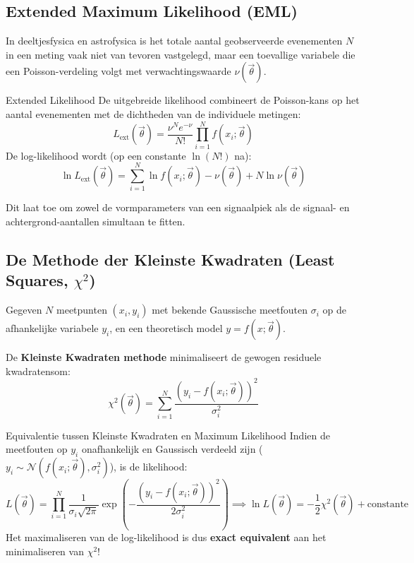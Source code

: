 \documentclass[11pt,a4paper]{article}
\newcommand{\normdist}{\mathcal{N}}
\begin{document}
\subsection{Extended Maximum Likelihood (EML)}
In deeltjesfysica en astrofysica is het totale aantal geobserveerde evenementen $N$ in een meting vaak niet van tevoren vastgelegd, maar een toevallige variabele die een Poisson-verdeling volgt met verwachtingswaarde $\nu(\vec{\theta})$.

\begin{defbox}{Extended Likelihood}
De uitgebreide likelihood combineert de Poisson-kans op het aantal evenementen met de dichtheden van de individuele metingen:
\begin{equation}
    L_{\text{ext}}(\vec{\theta}) = \frac{\nu^N e^{-\nu}}{N!} \prod_{i=1}^N f(x_i; \vec{\theta})
\end{equation}
De log-likelihood wordt (op een constante $\ln(N!)$ na):
\begin{equation}
    \ln L_{\text{ext}}(\vec{\theta}) = \sum_{i=1}^N \ln f(x_i; \vec{\theta}) - \nu(\vec{\theta}) + N \ln \nu(\vec{\theta})
\end{equation}
\end{defbox}
Dit laat toe om zowel de vormparameters van een signaalpiek als de signaal- en achtergrond-aantallen simultaan te fitten.

\subsection{De Methode der Kleinste Kwadraten (Least Squares, \texorpdfstring{$\chi^2$}{Chi-kwadraat})}
Gegeven $N$ meetpunten $(x_i, y_i)$ met bekende Gaussische meetfouten $\sigma_i$ op de afhankelijke variabele $y_i$, en een theoretisch model $y = f(x; \vec{\theta})$.

\begin{formulabox}
De \textbf{Kleinste Kwadraten methode} minimaliseert de gewogen residuele kwadratensom:
\begin{equation}
    \chi^2(\vec{\theta}) = \sum_{i=1}^N \frac{(y_i - f(x_i; \vec{\theta}))^2}{\sigma_i^2}
\end{equation}
\end{formulabox}

\begin{theobox}{Equivalentie tussen Kleinste Kwadraten en Maximum Likelihood}
Indien de meetfouten op $y_i$ onafhankelijk en Gaussisch verdeeld zijn ($y_i \sim \normdist(f(x_i; \vec{\theta}), \sigma_i^2)$), is de likelihood:
\begin{equation}
    L(\vec{\theta}) = \prod_{i=1}^N \frac{1}{\sigma_i \sqrt{2\pi}} \exp\left( -\frac{(y_i - f(x_i; \vec{\theta}))^2}{2\sigma_i^2} \right) \implies \ln L(\vec{\theta}) = -\frac{1}{2}\chi^2(\vec{\theta}) + \text{constante}
\end{equation}
Het maximaliseren van de log-likelihood is dus \textbf{exact equivalent} aan het minimaliseren van $\chi^2$!
\end{theobox}
\end{document}
